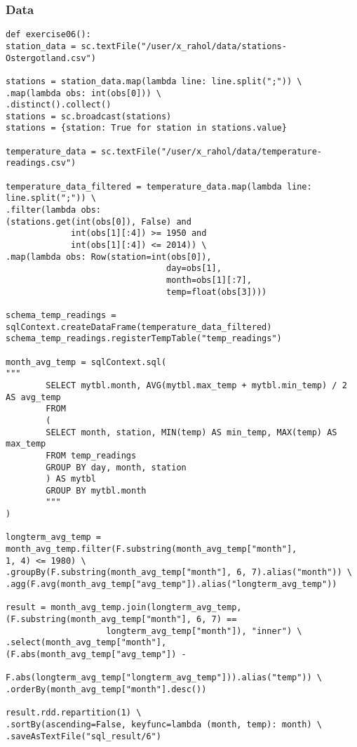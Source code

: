 \documentclass[10pt]{article}
\begin{document}
\subsubsection*{Data}
\label{sec-6-2-1}
\begin{verbatim}
def exercise06():
station_data = sc.textFile("/user/x_rahol/data/stations-Ostergotland.csv")

stations = station_data.map(lambda line: line.split(";")) \
.map(lambda obs: int(obs[0])) \
.distinct().collect()
stations = sc.broadcast(stations)
stations = {station: True for station in stations.value}

temperature_data = sc.textFile("/user/x_rahol/data/temperature-readings.csv")

temperature_data_filtered = temperature_data.map(lambda line: line.split(";")) \
.filter(lambda obs:
(stations.get(int(obs[0]), False) and
             int(obs[1][:4]) >= 1950 and
             int(obs[1][:4]) <= 2014)) \
.map(lambda obs: Row(station=int(obs[0]),
                                day=obs[1],
                                month=obs[1][:7],
                                temp=float(obs[3])))

schema_temp_readings = sqlContext.createDataFrame(temperature_data_filtered)
schema_temp_readings.registerTempTable("temp_readings")

month_avg_temp = sqlContext.sql(
"""
        SELECT mytbl.month, AVG(mytbl.max_temp + mytbl.min_temp) / 2 AS avg_temp
        FROM
        (
        SELECT month, station, MIN(temp) AS min_temp, MAX(temp) AS max_temp
        FROM temp_readings
        GROUP BY day, month, station
        ) AS mytbl
        GROUP BY mytbl.month
        """
)

longterm_avg_temp = month_avg_temp.filter(F.substring(month_avg_temp["month"], 
1, 4) <= 1980) \
.groupBy(F.substring(month_avg_temp["month"], 6, 7).alias("month")) \
.agg(F.avg(month_avg_temp["avg_temp"]).alias("longterm_avg_temp"))

result = month_avg_temp.join(longterm_avg_temp,
(F.substring(month_avg_temp["month"], 6, 7) ==
                    longterm_avg_temp["month"]), "inner") \
.select(month_avg_temp["month"],
(F.abs(month_avg_temp["avg_temp"]) -
              F.abs(longterm_avg_temp["longterm_avg_temp"])).alias("temp")) \
.orderBy(month_avg_temp["month"].desc())

result.rdd.repartition(1) \
.sortBy(ascending=False, keyfunc=lambda (month, temp): month) \
.saveAsTextFile("sql_result/6")
\end{verbatim}
\end{document}
